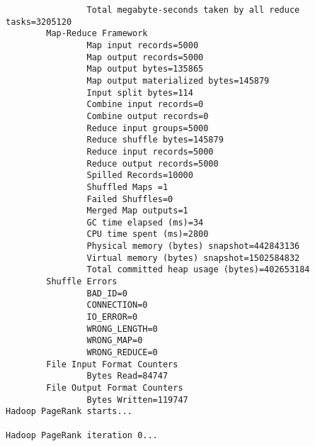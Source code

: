 \begin{lstlisting}
                Total megabyte-seconds taken by all reduce tasks=3205120
        Map-Reduce Framework
                Map input records=5000
                Map output records=5000
                Map output bytes=135865
                Map output materialized bytes=145879
                Input split bytes=114
                Combine input records=0
                Combine output records=0
                Reduce input groups=5000
                Reduce shuffle bytes=145879
                Reduce input records=5000
                Reduce output records=5000
                Spilled Records=10000
                Shuffled Maps =1
                Failed Shuffles=0
                Merged Map outputs=1
                GC time elapsed (ms)=34
                CPU time spent (ms)=2800
                Physical memory (bytes) snapshot=442843136
                Virtual memory (bytes) snapshot=1502584832
                Total committed heap usage (bytes)=402653184
        Shuffle Errors
                BAD_ID=0
                CONNECTION=0
                IO_ERROR=0
                WRONG_LENGTH=0
                WRONG_MAP=0
                WRONG_REDUCE=0
        File Input Format Counters
                Bytes Read=84747
        File Output Format Counters
                Bytes Written=119747
Hadoop PageRank starts...

Hadoop PageRank iteration 0...


\end{lstlisting}
